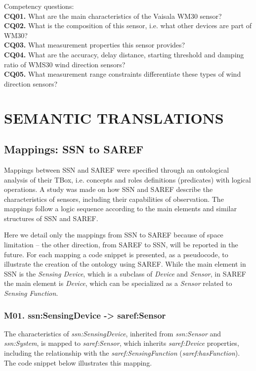 \documentclass{sig-alternate-05-2015}
\begin{document}
Competency questions: 
\\\textbf{CQ01.} What are the main characteristics of the Vaisala WM30 sensor? 
\\\textbf{CQ02.} What is the composition of this sensor, i.e. what other devices are part of WM30?
\\\textbf{CQ03.} What measurement properties this sensor provides?
\\\textbf{CQ04.} What are the accuracy, delay distance, starting threshold and damping ratio of WMS30 wind direction sensors? 
\\\textbf{CQ05.} What measurement range constraints differentiate these types of wind direction sensors?

\section{SEMANTIC TRANSLATIONS}

\subsection{Mappings: SSN to SAREF}
Mappings between SSN and SAREF were specified through an ontological analysis of their TBox, i.e. concepts and roles definitions (predicates) with logical operations. A study was made on how SSN and SAREF describe the characteristics of sensors, including their capabilities of observation. The mappings follow a logic sequence according to the main elements and similar structures of SSN and SAREF. 

Here we detail only the mappings from SSN to SAREF because of space limitation – the other direction, from SAREF to SSN, will be reported in the future. For each mapping a code snippet is presented, as a pseudocode, to illustrate the creation of the ontology using SAREF. While the main element in SSN is the \textit{Sensing Device}, which is a subclass of \textit{Device} and \textit{Sensor}, in SAREF the main element is \textit{Device}, which can be specialized as a \textit{Sensor} related to \textit{Sensing Function}. 

\subsubsection{M01. ssn:SensingDevice -> saref:Sensor}
The characteristics of \textit{ssn:SensingDevice}, inherited from \textit{ssn:Sensor} and \textit{ssn:System}, is mapped to \textit{saref:Sensor}, which inherits \textit{saref:Device} properties, including the relationship with the \textit{saref:SensingFunction} (\textit{saref:hasFunction}). The code snippet below illustrates this mapping. 
\end{document}
